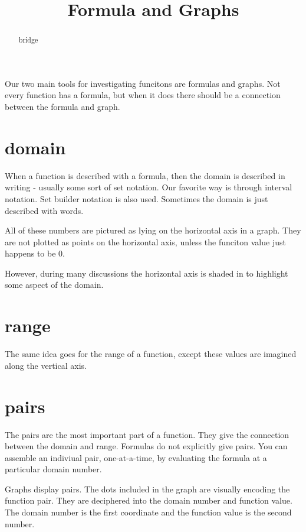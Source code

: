 \documentclass{ximera}
\title{Formula and Graphs}
\begin{document}
\begin{abstract}
bridge
\end{abstract}
\maketitle



Our two main tools for investigating funcitons are formulas and graphs. Not every function has a formula, but when it does there should be a connection between the formula and graph.

\section{domain}
When a function is described with a formula, then the domain is described in writing - usually some sort of set notation.  Our favorite way is through interval notation.  Set builder notation is also used.  Sometimes the domain is just described with words.

All of these numbers are pictured as lying on the horizontal axis in a graph.  They are not plotted as points on the horizontal axis, unless the funciton value just happens to be $0$.

However, during many discussions the horizontal axis is shaded in to highlight some aspect of the domain.







\section{range}
The same idea goes for the range of a function, except these values are imagined along the vertical axis.








\section{pairs}
The pairs are the most important part of a function.  They give the connection between the domain and range.  Formulas do not explicitly give pairs. You can assemble an indiviual pair, one-at-a-time, by evaluating the formula at a particular domain number.

Graphs display pairs.  The dots included in the graph are visually encoding the function pair.  They are deciphered into the domain number and function value. The domain number is the first coordinate and the function value is the second number.
\end{document}
